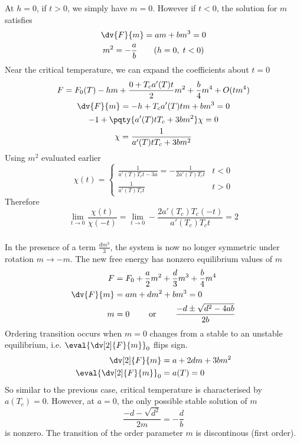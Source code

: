 \documentclass[12pt]{article}
\begin{document}
        \subsubsection{} At \(h = 0\), if \(t > 0\), we simply have \(m = 0\). However if \(t < 0\), the solution for \(m\) satisfies \begin{gather*}
            \dv{F}{m} = am + bm^3 = 0\\
            m^2 =- \frac{a}{b}\qquad (h = 0,\; t < 0)
        \end{gather*}
        Near the critical temperature, we can expand the coefficients about \(t = 0\) 
        \begin{gather*}
            F =  F_0(T) - hm + \frac{0 + T_c a'(T) t}{2}m^2 + \frac{b}{4}m^4 + O(t m^4)\\
            \dv{F}{m} = - h + T_c a'(T) t m + bm^3 = 0\\
            - 1 + \pqty{a'(T) t T_c+ 3bm^2} \chi  = 0\\
            \chi = \frac{1}{a'(T) t T_c + 3bm^2}
        \end{gather*}
        Using \(m^2\) evaluated earlier \[
            \chi(t) = \begin{cases} 
                \frac{1}{a'(T) T_c t - 3a} = -\frac{1}{2a'(T)T_c t} & t < 0 \\
                \frac{1}{a'(T) T_c t} & t > 0
             \end{cases}
        \]
        Therefore \[
            \lim_{t \to 0} \frac{\chi(t)}{\chi( - t)} = \lim_{t \to 0} -\frac{2a'(T_c)T_c ( -t)}{a'(T_c)T_c t} = 2
        \]
        \subsubsection{} In the presence of a term \(\frac{dm^3}{3}\), the system is now no longer symmetric under rotation \(m \to  - m\). The new free energy has nonzero equilibrium values of \(m\) \begin{align*}
            F &= F_0 + \frac{a}{2} m^2 + \frac{d}{3} m^3 + \frac{b}{4} m^4\\
            \dv{F}{m} &= a m + dm^2 + b m^3 = 0\\
            m &= 0\qquad \text{ or }\qquad \frac{-d\pm \sqrt{d^2-4ab}}{2b}
        \end{align*}
        Ordering transition occurs when \(m = 0\) changes from a stable to an unstable equilibrium, i.e. \(\eval{\dv[2]{F}{m}}_0\) flips sign. \begin{align*}
            \dv[2]{F}{m} &= a + 2dm + 3bm^2\\
            \eval{\dv[2]{F}{m}}_0 &= a(T) = 0
        \end{align*}
        So similar to the previous case, critical temperature is characterised by \(a(T_c) = 0\). However, at \(a = 0\), the only possible stable solution of \(m\) \[
            \frac{ - d - \sqrt{d^2}}{2m} = - \frac{d}{b}
        \]
        is nonzero. The transition of the order parameter \(m\) is discontinous (first order).
\end{document}

